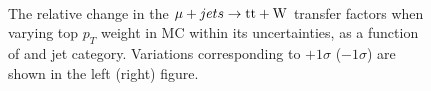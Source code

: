 \begin{figure}[!h]
  \centering
   ~~
  \\

  \caption{\label{fig:tfSyst_topPt_muToTtw} The relative change in the $\mu + jets \rightarrow \mathrm{tt+W}$ transfer
  factors when varying top $p_{T}$ weight in MC within its uncertainties, as a function of \scalht and jet category. 
  Variations corresponding to $+1\sigma$ ($-1\sigma$) are shown in the left (right) figure. 
  }
\end{figure}



